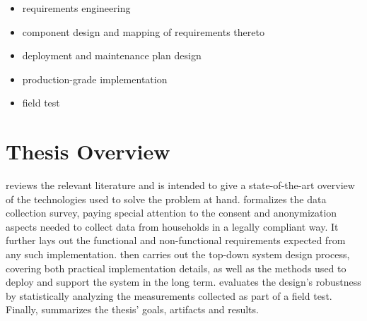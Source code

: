 \begin{itemize}
  \item requirements engineering
  \item component design and mapping of requirements thereto
  \item deployment and maintenance plan design
  \item production-grade implementation
  \item field test
\end{itemize}

\section{Thesis Overview}
\label{sec:thesis-overview}

 reviews the relevant literature and is intended to give a state-of-the-art overview of the technologies used to solve the problem at hand.  formalizes the data collection survey, paying special attention to the consent and anonymization aspects needed to collect data from households in a legally compliant way. It further lays out the functional and non-functional requirements expected from any such implementation.  then carries out the top-down system design process, covering both practical implementation details, as well as the methods used to deploy and support the system in the long term.  evaluates the design's robustness by statistically analyzing the measurements collected as part of a field test. Finally,  summarizes the thesis' goals, artifacts and results.

